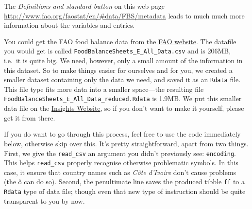 \documentclass[]{book}
\begin{document}
The \emph{Definitions and standard button} on this web page \url{http://www.fao.org/faostat/en/\#data/FBS/metadata} leads to much much more information about the variables and entries.

You could get the FAO food balance data from the \href{http://www.fao.org/faostat/en/\#data/FBS/metadata}{FAO website}. The datafile you would get is called \texttt{FoodBalanceSheets\_E\_All\_Data.csv} and is 206MB, i.e.~it is quite big. We need, however, only a small amount of the information in this dataset. So to make things easier for ourselves and for you, we created a smaller dataset containing only the data we need, and saved it as an \texttt{Rdata} file. This file type fits more data into a smaller space---the resulting file \texttt{FoodBalanceSheets\_E\_All\_Data\_reduced.Rdata} is 1.9MB. We put this smaller data file on the \href{insightsfromdata.io}{Insights Website}, so if you don't want to make it yourself, please get it from there.

If you do want to go through this process, feel free to use the code immediately below, otherwise skip over this. It's pretty straightforward, apart from two things. First, we give the \texttt{read\_csv} an argument you didn't previously see: \texttt{encoding}. This helps \texttt{read\_csv} properly recognise otherwise problematic symbols. In this case, it ensure that country names such as \emph{Côte d'Ivoire} don't cause problems (the ô can do so). Second, the penultimate line saves the produced tibble \texttt{ff} to a \texttt{Rdata} type of data file; though even that new type of instruction should be quite transparent to you by now.
\end{document}
